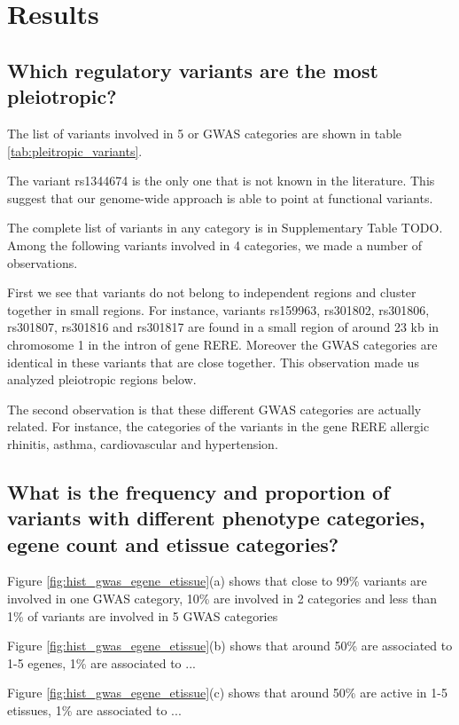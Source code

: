 \lipsum[2][1]

\section*{Results}\label{s:results}

\subsection*{Which regulatory variants are the most pleiotropic?}

The list of variants involved in 5 or GWAS categories are shown in table \ref{tab:pleitropic_variants}. 

The variant rs1344674 is the only one that is not known in the literature.
This suggest that our genome-wide approach is able to point at functional variants.

The complete list of variants in any category is in Supplementary Table TODO.
Among the following variants involved in 4 categories, we made a number of observations.

First we see that variants do not belong to independent regions and cluster together in small regions.
For instance, variants rs159963, rs301802, rs301806, rs301807, rs301816 and rs301817 are found in a small region of around 23 kb in chromosome 1 in the intron of gene RERE.
Moreover the GWAS categories are identical in these variants that are close together.
This observation made us analyzed pleiotropic regions below.

The second observation is that these different GWAS categories are actually related.
For instance, the categories of the variants in the gene RERE allergic rhinitis, asthma, cardiovascular and hypertension.

\subsection*{What is the frequency and proportion of variants with different phenotype categories, egene count and etissue categories?}

Figure \ref{fig:hist_gwas_egene_etissue}(a) shows that close to 99\% variants are involved in one GWAS category, 10\% are involved in 2 categories and less than 1\% of variants are involved in 5 GWAS categories

Figure \ref{fig:hist_gwas_egene_etissue}(b) shows that around 50\% are associated to 1-5 egenes, 1\% are associated to ...

Figure \ref{fig:hist_gwas_egene_etissue}(c) shows that around 50\% are active in 1-5 etissues, 1\% are associated to ...

